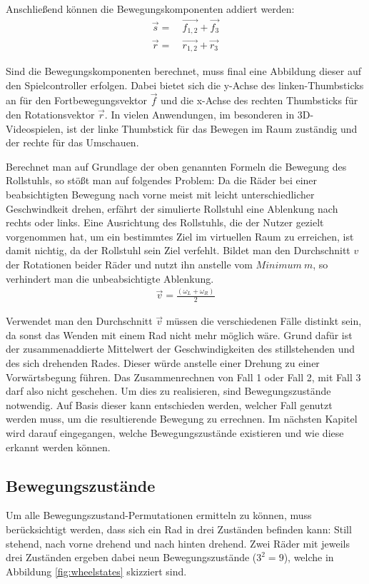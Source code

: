 Anschließend können die Bewegungskomponenten addiert werden:
\begin{align}
    \vec{s} = & \ \vec{f_{1,2}} + \vec{f_3} \\
    \vec{r} = & \ \vec{r_{1,2}} + \vec{r_3}
\end{align}

Sind die Bewegungskomponenten berechnet, muss final eine Abbildung dieser auf den Spielcontroller erfolgen.
Dabei bietet sich die y-Achse des linken-Thumbsticks an für den Fortbewegungsvektor $\vec{f}$ und die x-Achse des rechten Thumbsticks für den Rotationsvektor $\vec{r}$.
In vielen Anwendungen, im besonderen in 3D-Videospielen, ist der linke Thumbstick für das Bewegen im Raum zuständig und der rechte für das Umschauen.

Berechnet man auf Grundlage der oben genannten Formeln die Bewegung des Rollstuhls, so stößt man auf folgendes Problem:
Da die Räder bei einer beabsichtigten Bewegung nach vorne meist mit leicht unterschiedlicher Geschwindkeit drehen, erfährt der simulierte Rollstuhl eine Ablenkung nach rechts oder links.
Eine Ausrichtung des Rollstuhls, die der Nutzer gezielt vorgenommen hat, um ein bestimmtes Ziel im virtuellen Raum zu erreichen, ist damit nichtig, da der Rollstuhl sein Ziel verfehlt.
Bildet man den Durchschnitt $v$ der Rotationen beider Räder und nutzt ihn anstelle vom $Minimum\ m$, so verhindert man die unbeabsichtigte Ablenkung.
\begin{align}
    \vec{v} = \frac {(\omega_L + \omega_R)} {2}
\end{align}

Verwendet man den Durchschnitt $\vec{v}$ müssen die verschiedenen Fälle distinkt sein, da sonst das Wenden mit einem Rad nicht mehr möglich wäre.
Grund dafür ist der zusammenaddierte Mittelwert der Geschwindigkeiten des stillstehenden und des sich drehenden Rades.
Dieser würde anstelle einer Drehung zu einer Vorwärtsbegung führen.
Das Zusammenrechnen von Fall 1 oder Fall 2, mit Fall 3 darf also nicht geschehen.
Um dies zu realisieren, sind Bewegungszustände notwendig.
Auf Basis dieser kann entschieden werden, welcher Fall genutzt werden muss, um die resultierende Bewegung zu errechnen.
Im nächsten Kapitel wird darauf eingegangen, welche Bewegungszustände existieren und wie diese erkannt werden können.

\subsection{Bewegungszustände}
Um alle Bewegungszustand-Permutationen ermitteln zu können, muss berücksichtigt werden, dass sich ein Rad in drei Zuständen befinden kann: Still stehend, nach vorne drehend und nach hinten drehend.
Zwei Räder mit jeweils drei Zuständen ergeben dabei neun Bewegungszustände ($3^2 = 9$), welche in Abbildung \ref{fig:wheelstates} skizziert sind.

